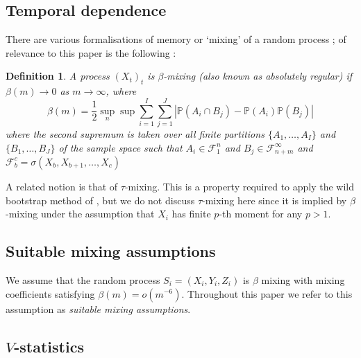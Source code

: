 \documentclass[]{article}
\newtheorem{definition}{Definition}
\begin{document}
\subsection{Temporal dependence}
There are various formalisations of memory or `mixing' of a random process \citep{doukhan1994mixing,bradley2005basic,dedecker2007weak}; of relevance to this paper is the following :


\begin{definition}
A process $(X_t)_{t}$ is \emph{$\beta$-mixing} (also known as \emph{absolutely regular}) if $\beta(m) \longrightarrow 0$ as $m\longrightarrow \infty$, where
\[ \beta(m) = \frac{1}{2} \sup_n \sup \sum_{i=1}^I \sum_{j=1}^J | \mathbb{P}(A_i \cap B_j) - \mathbb{P}(A_i)\mathbb{P}(B_j)| \]
where the second supremum is taken  over all finite partitions $\{A_1,\ldots, A_I \}$ and  $\{B_1,\ldots, B_J\}$ of the sample space such that $A_i \in \mathcal{F}_1^n$ and $B_j \in \mathcal{F}_{n+m}^\infty$ and $\mathcal{F}_b^c = \sigma(X_b,X_{b+1},\ldots,X_{c})$
\end{definition}
A related notion is that of $\tau$-mixing. This is a property required to apply the wild bootstrap method of \citet{leucht2013dependent}, but we do not discuss $\tau$-mixing here since it is implied by $\beta$-mixing under the assumption that $X_i$ has finite $p$-th moment for any $p>1$.   


\subsection*{Suitable mixing assumptions} We assume that the random process $S_i = (X_i,Y_i,Z_i)$ is $\beta$ mixing with mixing coefficients satisfying   $\beta(m)  = o(m^{-6})$. Throughout this paper we refer to this assumption as \emph{suitable mixing assumptions}.


\subsection{$V$-statistics}\label{subsection:v-statistic}
\end{document}
